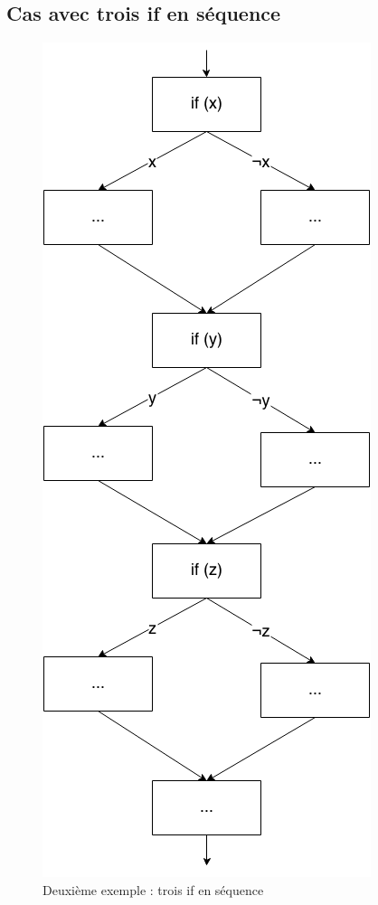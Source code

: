 \documentclass[french]{article}
\begin{document}
  \subsection{Cas avec trois if en séquence}
  \begin{figure}
    \centering
    \includegraphics[scale=0.4]{./pictures/if_3seq.png}
    \caption{Deuxième exemple : trois if en séquence}
    \label{if_3seq}
  \end{figure}
\end{document}
